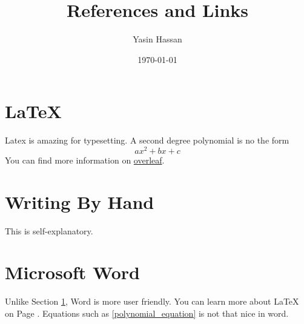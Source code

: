 \documentclass{article}
\title{References and Links}
\author{Yasin Hassan}
\date{\today}
\begin{document}
\maketitle

\tableofcontents

\section{LaTeX}\label{Latex-section}
Latex is amazing for typesetting. A second degree polynomial is no the form 
\begin{equation}\label{polynomial_equation}
ax^{2} + bx + c
\end{equation}
You can find more information on \href{www.overleaf.com}{overleaf}.

\section{Writing By Hand}
This is self-explanatory.
\newpage
\section{Microsoft Word}
Unlike Section \ref{Latex-section}, Word is more user friendly. You can learn more about LaTeX on Page \pageref{Latex-section}. Equations such as \eqref{polynomial_equation} is not that nice in word.
\end{document}

